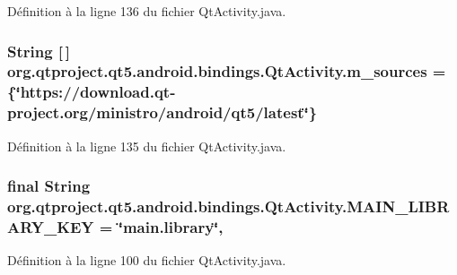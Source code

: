 Définition à la ligne 136 du fichier Qt\-Activity.\-java.

\hypertarget{classorg_1_1qtproject_1_1qt5_1_1android_1_1bindings_1_1_qt_activity_a9cb36331162103703e5861eae9ce2caa}{
\subsubsection[{m\-\_\-sources}]{\setlength{\rightskip}{0pt plus 5cm}String \mbox{[}$\,$\mbox{]} org.\-qtproject.\-qt5.\-android.\-bindings.\-Qt\-Activity.\-m\-\_\-sources = \{\char`\"{}https\-://download.\-qt-\/project.\-org/ministro/android/qt5/latest\char`\"{}\}\hspace{0.3cm}{\ttfamily [private]}}}\label{classorg_1_1qtproject_1_1qt5_1_1android_1_1bindings_1_1_qt_activity_a9cb36331162103703e5861eae9ce2caa}


Définition à la ligne 135 du fichier Qt\-Activity.\-java.

\hypertarget{classorg_1_1qtproject_1_1qt5_1_1android_1_1bindings_1_1_qt_activity_a26a671584c763cc53820a168f2148705}{
\subsubsection[{M\-A\-I\-N\-\_\-\-L\-I\-B\-R\-A\-R\-Y\-\_\-\-K\-E\-Y}]{\setlength{\rightskip}{0pt plus 5cm}final String org.\-qtproject.\-qt5.\-android.\-bindings.\-Qt\-Activity.\-M\-A\-I\-N\-\_\-\-L\-I\-B\-R\-A\-R\-Y\-\_\-\-K\-E\-Y = \char`\"{}main.\-library\char`\"{}\hspace{0.3cm}{\ttfamily [static]}, {\ttfamily [private]}}}\label{classorg_1_1qtproject_1_1qt5_1_1android_1_1bindings_1_1_qt_activity_a26a671584c763cc53820a168f2148705}


Définition à la ligne 100 du fichier Qt\-Activity.\-java.

